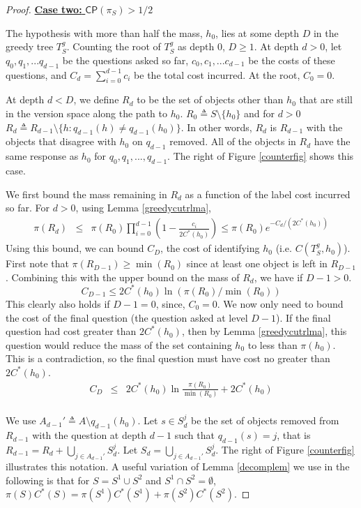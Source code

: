 \documentclass{article}
\begin{document}
\begin{proof}
\noindent \underline{\textbf{Case two:} $\mathsf{CP}(\pi_S) > 1/2$}

The hypothesis with more than half the mass, $h_0$, 
lies at some depth $D$ in the greedy tree $T^g_S$.  
Counting the root of $T^g_S$ as depth $0$, $D \geq 1$. 
At depth $d>0$, let $q_0, q_1, ... q_{d-1}$ be the questions
asked so far, $c_0, c_1, ... c_{d-1}$ be the costs of these questions, 
and $C_d = \sum_{i=0}^{d-1} c_i$ be the total cost incurred.  At
the root, $C_0=0$.  

At depth $d < D$, we define $R_d$ to be the set of objects other than
$h_0$ that are still in the version space along the path to $h_0$.
$R_0 \triangleq S \setminus \lbrace h_0 \rbrace$
and for $d > 0$
$R_d \triangleq 
R_{d-1} \setminus \lbrace h : q_{d-1}(h) \neq q_{d-1}(h_0) \rbrace $.
In other words, $R_d$ is $R_{d-1}$ with the objects that
disagree with $h_0$ on $q_{d-1}$ removed.  
All of the objects in $R_d$ have the same response as $h_0$ 
for $q_0, q_1, ..., q_{d-1}$.  The right of Figure \ref{counterfig} 
shows this case.

We first bound the mass  remaining in $R_d$ as a function of the label cost 
incurred so far. 
For $d>0$, using Lemma \ref{greedycutrlma}, 
\begin{eqnarray*}
\pi(R_d) & \leq & \pi(R_0) \prod_{i=0}^{d-1} (1 - \frac{c_i}{2C^*(h_0)}) 
\leq \pi(R_0) e^{-C_d / (2C^*(h_0))} 
\end{eqnarray*}
Using this bound, we can bound $C_D$, the cost of identifying
$h_0$ (i.e. $C(T^g_S, h_0)$). 
First note that $\pi(R_{D-1}) \geq \min(R_0)$ since at
least one object is left in $R_{D-1}$.  Combining this with the
upper bound on the mass of $R_d$, we have if $D-1>0$.
\[ C_{D-1} \leq 2 C^*(h_0) \ln(\pi(R_0)/\min(R_0)) \]
This clearly also holds if $D-1=0$, since, $C_0=0$.
We now only need to bound the cost of the final question (the question
asked at level $D-1$).  If the final question had cost greater than
$2C^*(h_0)$, then by Lemma \ref{greedycutrlma}, this question would
reduce the mass of the set containing $h_0$ to less than $\pi(h_0)$.
This is a contradiction, so the final question must have cost no greater
than $2C^*(h_0)$.  
\begin{eqnarray*}
C_{D} & \leq & 2 C^*(h_0) \ln\frac{\pi(R_0)}{\min(R_0)} + 2C^*(h_0) \\
\end{eqnarray*}

We use $A_{d-1}' \triangleq A \setminus q_{d-1}(h_0)$.  
Let $s \in S_d^j$ be the set of objects removed from $R_{d-1}$ with the
question at depth $d-1$ such that $q_{d-1}(s)=j$, that is
$R_{d-1}=R_d+\bigcup_{j \in A_{d-1}'}S_d^j$. 
Let $S_d = \bigcup_{j \in A_{d-1}'} S_d^j$.
The right of Figure \ref{counterfig} illustrates this notation.
A useful variation of Lemma \ref{decomplem} we use
in the following is that for
$S = S^1 \cup S^2$ and $S^1 \cap S^2 = \emptyset$,
$\pi(S) C^*(S) = \pi(S^1) C^*(S^1) + \pi(S^2) C^*(S^2)$.


\end{proof}
\end{document}
